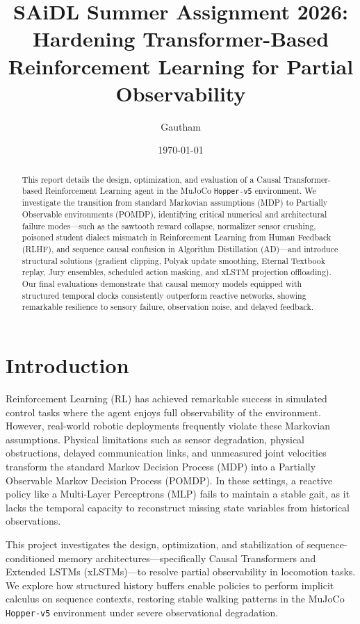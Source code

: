 \documentclass[11pt,a4paper]{article}
\title{\textbf{SAiDL Summer Assignment 2026: Hardening Transformer-Based Reinforcement Learning for Partial Observability}}
\author{Gautham}
\date{\today}
\begin{document}
\maketitle

\begin{abstract}
This report details the design, optimization, and evaluation of a Causal Transformer-based Reinforcement Learning agent in the MuJoCo \texttt{Hopper-v5} environment. We investigate the transition from standard Markovian assumptions (MDP) to Partially Observable environments (POMDP), identifying critical numerical and architectural failure modes---such as the sawtooth reward collapse, normalizer sensor crushing, poisoned student dialect mismatch in Reinforcement Learning from Human Feedback (RLHF), and sequence causal confusion in Algorithm Distillation (AD)---and introduce structural solutions (gradient clipping, Polyak update smoothing, Eternal Textbook replay, Jury ensembles, scheduled action masking, and xLSTM projection offloading). Our final evaluations demonstrate that causal memory models equipped with structured temporal clocks consistently outperform reactive networks, showing remarkable resilience to sensory failure, observation noise, and delayed feedback.
\end{abstract}

\newpage
\tableofcontents
\newpage

\section{Introduction}
Reinforcement Learning (RL) has achieved remarkable success in simulated control tasks where the agent enjoys full observability of the environment. However, real-world robotic deployments frequently violate these Markovian assumptions. Physical limitations such as sensor degradation, physical obstructions, delayed communication links, and unmeasured joint velocities transform the standard Markov Decision Process (MDP) into a Partially Observable Markov Decision Process (POMDP). In these settings, a reactive policy like a Multi-Layer Perceptrons (MLP) fails to maintain a stable gait, as it lacks the temporal capacity to reconstruct missing state variables from historical observations.

This project investigates the design, optimization, and stabilization of sequence-conditioned memory architectures—specifically Causal Transformers and Extended LSTMs (xLSTMs)—to resolve partial observability in locomotion tasks. We explore how structured history buffers enable policies to perform implicit calculus on sequence contexts, restoring stable walking patterns in the MuJoCo \texttt{Hopper-v5} environment under severe observational degradation.
\end{document}
